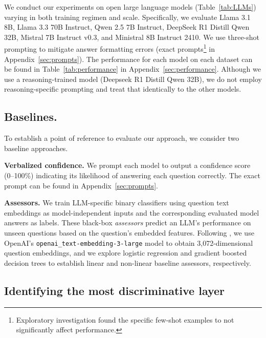 \documentclass{article} %
\begin{document}
We conduct our experiments on open large language models (Table~\ref{tab:LLMs}) varying in both training regimen and scale. Specifically, we evaluate Llama 3.1 8B, Llama 3.3 70B Instruct, Qwen 2.5 7B Instruct, DeepSeek R1 Distill Qwen 32B, Mistral 7B Instruct v0.3, and Ministral 8B Instruct 2410. 
We use three-shot prompting to mitigate answer formatting errors (exact prompts\footnote{Exploratory investigation found  the specific few-shot examples to not significantly affect performance.} in Appendix~\ref{sec:prompts}). The performance for each model on each dataset can be found in Table~\ref{tab:performance} in Appendix~\ref{sec:performance}. Although we use a reasoning-trained model (Deepseek R1 Distill Qwen 32B), we do not employ reasoning-specific prompting and treat that identically to the other models.

\subsection{Baselines.}\label{sec:baselines}

To establish a point of reference to evaluate our approach, we consider two baseline approaches.

\textbf{Verbalized confidence.} We prompt each model to output a confidence score (0–100\%) indicating its likelihood of answering each question correctly. The exact prompt can be found in Appendix~\ref{sec:prompts}. 


\textbf{Assessors.} We train LLM-specific binary classifiers using  question text embeddings as model-independent inputs and the corresponding evaluated model answers as labels. These black-box 
\textit{assessors} \citep{hernandez2022training} predict an LLM’s performance on unseen questions based on the question's embedded features. Following \cite{pacchiardi2024100instancesneedpredicting}, we use OpenAI’s \texttt{openai\_text-embedding-3-large} model to obtain 3,072-dimensional question embeddings, and we explore logistic regression and gradient boosted decision trees \citep{chen2016xgboost} to establish linear and non-linear baseline assessors, respectively.

\subsection{Identifying the most discriminative layer}\label{sec: find_layer}
\end{document}
